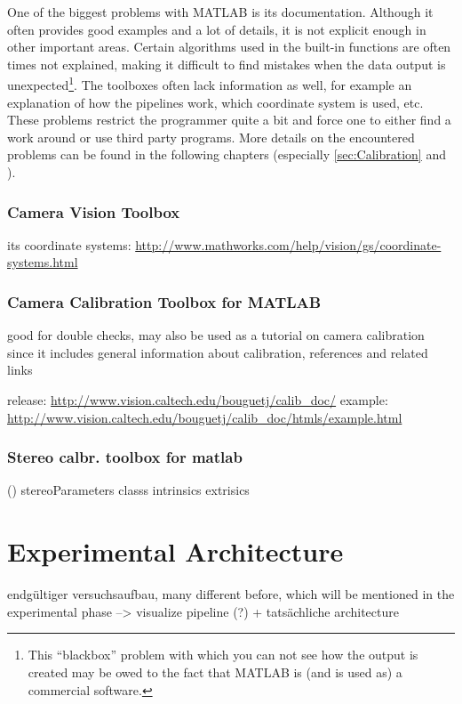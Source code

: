 One of the biggest problems with MATLAB is its documentation. Although it often provides good examples and a lot of details, it is not explicit enough in other important areas. Certain algorithms used in the built-in functions are often times not explained, making it difficult to find mistakes when the data output is unexpected\footnote{This \enquote{blackbox} problem with which you can not see how the output is created may be owed to the fact that MATLAB is (and is used as) a commercial software.}. The toolboxes often lack information as well, for example an explanation of how the pipelines work, which coordinate system is used, etc. These problems restrict the programmer quite a bit and force one to either find a work around or use third party programs. More details on the encountered problems can be found in the following chapters (especially \autoref{sec:Calibration} and ).

\subsubsection{Camera Vision Toolbox}
its coordinate systems: \url{http://www.mathworks.com/help/vision/gs/coordinate-systems.html}
\subsubsection{Camera Calibration Toolbox for MATLAB}
\cite{Bouguet.2015}
good for double checks, may also be used as a tutorial on camera calibration since it includes general information about calibration, references and related links

release: \url{http://www.vision.caltech.edu/bouguetj/calib_doc/}
example: \url{http://www.vision.caltech.edu/bouguetj/calib_doc/htmls/example.html}

\subsubsection{Stereo calbr. toolbox for matlab}\label{ssec:stereoCalibToolbox}
(\cite{StereoCalib.2016})
stereoParameters classs
intrinsics
extrisics


\section{Experimental Architecture} \label{sec:architecture}
endgültiger versuchsaufbau, many different before, which will be mentioned in the experimental phase --> visualize pipeline (?) + tatsächliche architecture


